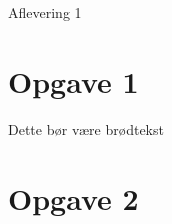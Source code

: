 \documentclass[12pt]{article}
\begin{document}
\begin{center}
\Huge
Aflevering 1
\end{center}
\section*{Opgave 1 
}

Dette bør være brødtekst

\section*{Opgave 2 
}
\end{document}
